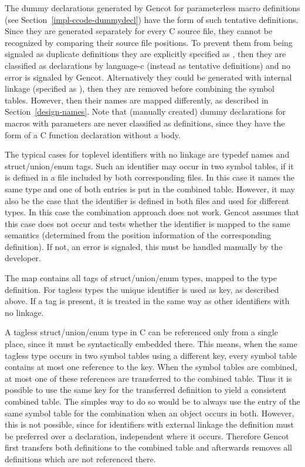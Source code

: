 The dummy declarations generated by Gencot for parameterless macro definitions (see Section~\ref{impl-ccode-dummydecl})
have the form of such tentative definitions. Since they are generated separately for every C source file, they cannot
be recognized by comparing their source file positions. To prevent them from being signaled as duplicate definitions they
are explicitly specified as , then they are classified as declarations by language-c (instead as tentative 
definitions) and no error is signaled by Gencot. Alternatively they could be generated with internal linkage (specified 
as ), then they are removed before combining the symbol tables. However, then their names are mapped differently,
as described in Section~\ref{design-names}. Note that (manually created) dummy declarations for
macros with parameters are never classified as definitions, since they have the form of a C function declaration without
a body. 

The typical cases for toplevel identifiers with no linkage are typedef names and struct/union/enum tags. Such an identifier
may occur in two symbol tables, if it is
defined in a file included by both corresponding  files. In this case it names the same type and one of both
entries is put in the combined table. However, it may also be the case that the identifier is defined in both 
files and used for different types. In this case the combination approach does not work. Gencot assumes that this case
does not occur and tests whether the identifier is mapped to the same semantics (determined from the position information
of the corresponding definition). If not, an error is signaled, this must be handled manually by the developer.

The map  contains all tags of struct/union/enum types, mapped to the type definition. For tagless types
the unique identifier is used as key, as described above. If a tag is present, it is treated in the same way as other 
identifiers with no linkage.

A tagless struct/union/enum type in C can be referenced only from a single place, since it must be syntactically embedded
there. This means, when the same tagless type occurs in two symbol tables using a different key, every symbol table
contains at most one reference to the key. When the symbol tables are combined, at most one of these references are transferred
to the combined table. Thus it is possible to use the same key for the transferred definition to yield a consistent
combined table. The simples way to do so would be to always use the entry of the same symbol table for the combination 
when an object occurs in both. However, this is not possible, since for identifiers with external linkage the definition
must be preferred over a declaration, independent where it occurs. Therefore Gencot first transfers both definitions to the 
combined table and afterwards removes all definitions which are not referenced there.


